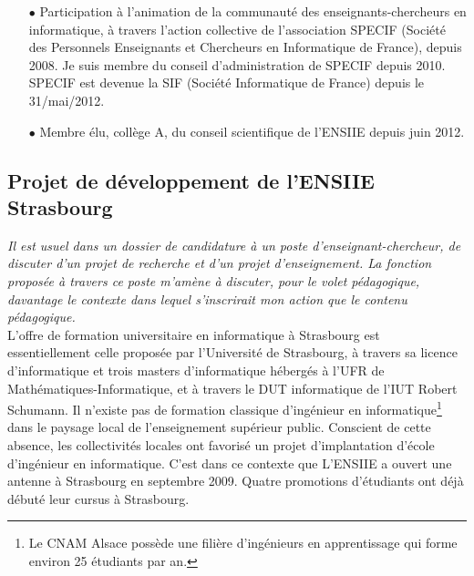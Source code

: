 \documentclass[11pt]{article}
\begin{document}
\begin{itemize}
\item[$\bullet$] 
Participation à l'animation de la communauté des enseignants-chercheurs en informatique, à travers 
l'action collective de l'association SPECIF (Société des Personnels Enseignants et Chercheurs 
en Informatique de France), depuis 2008. Je suis membre du conseil d'administration de SPECIF depuis 
2010. SPECIF est devenue la SIF (Société Informatique de France) depuis le 31/mai/2012.\\

\item[$\bullet$] 
Membre élu, collège A, du conseil scientifique de l'ENSIIE depuis juin 2012. 
\vspace{1cm}
\end{itemize}




\subsection{Projet de développement de l'ENSIIE Strasbourg}

\textit{%
Il est usuel dans un dossier de candidature à un poste d'enseignant-chercheur,
de discuter d'un  projet de recherche et d'un projet d'enseignement. La
fonction proposée à travers ce poste m'amène à discuter, pour le volet
pédagogique, davantage le contexte dans lequel s'inscrirait mon action
que le contenu pédagogique.}\\

L'offre   de  formation   universitaire   en  informatique   à  Strasbourg   est
essentiellement  celle proposée  par l'Université  de Strasbourg,  à travers  sa
licence  d'informatique et  trois  masters d'informatique  hébergés  à l'UFR  de
Mathématiques-Informatique, et  à travers  le DUT  informatique de  l'IUT Robert
Schumann.   Il   n'existe   pas    de   formation   classique   d'ingénieur   en
informatique\footnote{Le  CNAM  Alsace  possède   une  filière  d'ingénieurs  en
  apprentissage qui forme  environ 25 étudiants par an.}  dans  le paysage local
de   l'enseignement  supérieur   public.   Conscient   de  cette   absence,  les
collectivités locales ont favorisé  un projet d'implantation d'école d'ingénieur
en informatique.  C'est dans  ce contexte  que L'ENSIIE a  ouvert une  antenne à
Strasbourg en  septembre 2009.   Quatre promotions  d'étudiants ont  déjà débuté
leur cursus à Strasbourg.\\
\end{document}
